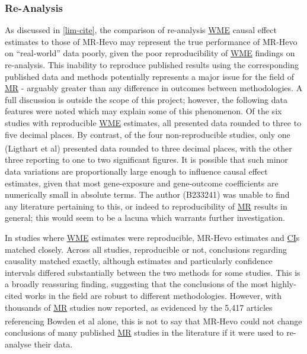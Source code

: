 \documentclass[
]{article}
\begin{document}
\subsubsection{Re-Analysis}\label{re-analysis}

As discussed in \ref{lim-cite}, the comparison of re-analysis \hyperref[acronyms_WME]{WME} causal effect estimates to those of MR-Hevo may represent the true performance of MR-Hevo on ``real-world'' data poorly, given the poor reproducibility of \hyperref[acronyms_WME]{WME} findings on re-analysis. This inability to reproduce published results using the corresponding published data and methods potentially represents a major issue for the field of \hyperref[acronyms_MR]{MR} - arguably greater than any difference in outcomes between methodologies. A full discussion is outside the scope of this project; however, the following data features were noted which may explain some of this phenomenon. Of the six studies with reproducible \hyperref[acronyms_WME]{WME} estimates, all presented data rounded to three to five decimal places. By contrast, of the four non-reproducible studies, only one (Ligthart et al\textsuperscript{}) presented data rounded to three decimal places, with the other three reporting to one to two significant figures. It is possible that such minor data variations are proportionally large enough to influence causal effect estimates, given that most gene-exposure and gene-outcome coefficients are numerically small in absolute terms. The author (B233241) was unable to find any literature pertaining to this, or indeed to reproducibility of \hyperref[acronyms_MR]{MR} results in general; this would seem to be a lacuna which warrants further investigation.

In studies where \hyperref[acronyms_WME]{WME} estimates were reproducible, MR-Hevo estimates and \hyperref[acronyms_CI]{CI}s matched closely. Across all studies, reproducible or not, conclusions regarding causality matched exactly, although estimates and particularly confidence intervals differed substantially between the two methods for some studies. This is a broadly reassuring finding, suggesting that the conclusions of the most highly-cited works in the field are robust to different methodologies. However, with thousands of \hyperref[acronyms_MR]{MR} studies now reported, as evidenced by the 5,417 articles referencing Bowden et al\textsuperscript{} alone, this is not to say that MR-Hevo could not change conclusions of many published \hyperref[acronyms_MR]{MR} studies in the literature if it were used to re-analyse their data.
\end{document}
